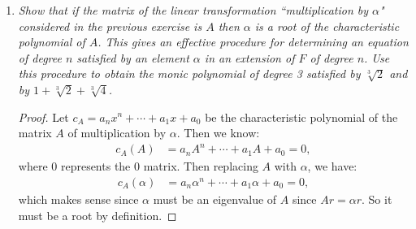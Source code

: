 \documentclass[9pt,reqno,twoside]{amsbook}
\theoremstyle{plain}
\numberwithin{section}{chapter}
\numberwithin{equation}{chapter}
\theoremstyle{definition}
\theoremstyle{remark}
\theoremstyle{plain}
\newcommand{\sub}{\subseteq}
\newcommand{\bee}{\begin{equation}\begin{aligned}}
\newcommand{\eee}{\end{aligned}\end{equation}}
\newcommand{\fracc}{\frac}
\begin{document}
\begin{enumerate}[label=\arabic*.]
\begin{proof}
Since $K/F$ is algebraic, we know that $\forall \alpha \in K$, $\alpha$ is algebraic over $F$. So $\alpha$ is the root of some polynomial $p(x) \in F[x]$. So let $r \in R$, nonzero, we wish to construct an inverse $r^{-1}$ for $r$. Then we have:
\bee
p(r) &= a_nr^n + \cdots + a_1r + a_0 = 0\\
a_0 &= -a_nr^n - \cdots - a_2r^2 - a_1r\\
1 &= -\fracc{a_n}{a_0} r^n - \cdots - \fracc{a_2}{a_0}r^2 - \fracc{a_1}{a_0}r\\
\fracc{1}{r} &= -\fracc{a_n}{a_0} r^{n- 1} - \cdots - \fracc{a_2}{a_0}r - \fracc{a_1}{a_0}. 
\eee
This is well defined since $r$ is nonzero. Thus we have found $r^{-1}$, and it is an element of $r$ since $a_i \in F \sub R$, and since we have additive and multiplicative closure in $R$. Thus we have inverses in $R$ and it is a field. 
\end{proof}

\setcounter{enumi}{19}

\item \textit{Show that if the matrix of the linear transformation ``multiplication by $\alpha$" considered in the previous exercise is $A$ then $\alpha$ is a root of the characteristic polynomial of $A$. This gives an effective procedure for determining an equation of degree $n$ satisfied by an element $\alpha$ in an extension of $F$ of degree $n$. Use this procedure to obtain the monic polynomial of degree 3 satisfied by $\sqrt[3]{2}$ and by $1 + \sqrt[3]{2} + \sqrt[3]{4}$. }

\begin{proof}
Let $c_A = a_nx^n + \cdots + a_1x + a_0$ be the characteristic polynomial of the matrix $A$ of multiplication by $\alpha$. Then we know:
\bee
c_A(A) &= a_nA^n + \cdots + a_1A + a_0 = 0,
\eee
where $0$ represents the 0 matrix. Then replacing $A$ with $\alpha$, we have:
\bee
c_A(\alpha) &= a_n\alpha^n + \cdots + a_1\alpha + a_0 = 0,
\eee
which makes sense since $\alpha$ must be an eigenvalue of $A$ since $Ar = \alpha r$. So it must be a root by definition.
\end{proof}




\end{enumerate}
\end{document}
